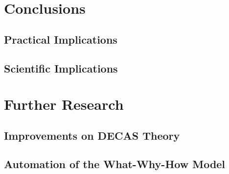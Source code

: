 \section{Conclusions}

\subsection{Practical Implications}

\subsection{Scientific Implications}

\section{Further Research}

\subsection{Improvements on DECAS Theory}

\subsection{Automation of the What-Why-How Model}